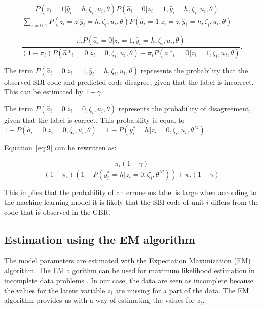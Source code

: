 \documentclass[12pt, a4paper, titlepage]{article}
\begin{document}
						\begin{equation}\label{eq:8}
\frac{P(z_i = 1|\hat{y}_i = h, \zeta_i, u_i, \theta) P(\hat{a}_i=0|z_i=1, \hat{y}_i = h, \zeta_i, u_i, \theta) }
{\sum_{z=0,1}P(z_i=z|\hat{y}_i = h, \zeta_i, u_i, \theta) P( \hat{a}_i=1|z_i=z, \hat{y}_i = h, \zeta_i, u_i, \theta  )} =
						\end{equation}

						\begin{equation}\label{eq:9}
\frac{\pi_i P(\hat{a}_i=0|z_i=1, \hat{y}_i = h, \zeta_i, u_i, \theta) }
{(1-\pi_i)P(\hat{a}*_i = 0 | z_i = 0, \zeta_i, u_i, \theta) + \pi_i P(\hat{a}*_i = 0 | z_i = 1, \zeta_i, u_i, \theta) } .
						\end{equation}

The term $P(\hat{a}_i= 0|z_i = 1, \hat{y}_i = h, \zeta_i, u_i, \theta)$ represents the probability that the observed SBI code and predicted code disagree, given that the label is incorrect. This can be estimated by $1-\gamma$.

The term $P(\hat{a}_i = 0 | z_i = 0, \zeta_i, u_i, \theta)$ represents the probability of disagreement, given that the label is correct. This probability is equal to $1 - P(\hat{a}_i = 0 | z_i = 0, \zeta_i, u_i, \theta) = 1 - P(y^*_i = h | z_i = 0, \zeta_i, u_i, \theta^M)$. 

Equation~\ref{eq:9} can be rewritten as:

						\begin{equation}\label{eq:10}
\frac{\pi_i (1-\gamma)}{(1-\pi_i)(1-P(y^*_i = h | z_i = 0, \zeta_i, \theta^M)) + \pi_i (1-\gamma)}
						\end{equation}


This implies that the probability of an erroneous label is large when according to the machine learning model it is likely that the SBI code of unit $i$ differs from the code that is observed in the GBR.

					\subsection{Estimation using the EM algorithm}
					\label{section:em}

The model parameters are estimated with the Expectation Maximization (EM) algorithm. The EM algorithm can be used for maximum likelihood estimation in incomplete data problems \citep{Rubin}. In our case, the data are seen as incomplete because the values for the latent variable $z_i$ are missing for a part of the data. The EM algorithm provides us with a way of estimating the values for $z_i$.
\end{document}

